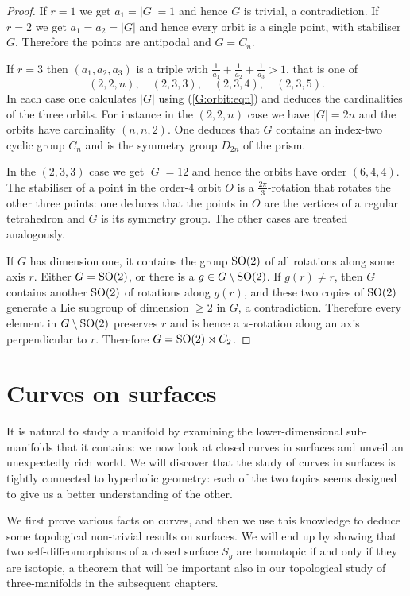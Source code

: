 \begin{proof}
If $r=1$ we get $a_1 = |G| = 1$ and hence $G$ is trivial, a contradiction. If $r=2$ we get $a_1 = a_2 = |G|$ and hence every orbit is a single point, with stabiliser $G$. Therefore the points are antipodal and $G=C_n$.

If $r=3$ then $(a_1,a_2, a_3)$ is a triple with $\frac 1{a_1} + \frac 1{a_2} + \frac 1{a_3} > 1$, that is one of
$$(2,2,n), \quad (2,3,3), \quad (2,3,4), \quad (2,3,5).$$
In each case one calculates $|G|$ using (\ref{G:orbit:eqn}) and deduces the cardinalities of the three orbits. For instance in the $(2,2,n)$ case we have $|G|=2n$ and the orbits have cardinality $(n,n,2)$. One deduces that $G$ contains an index-two cyclic group $C_n$ and is the symmetry group $D_{2n}$ of the prism.

In the $(2,3,3)$ case we get $|G|=12$ and hence the orbits have order $(6,4,4)$. The stabiliser of a point in the order-4 orbit $O$ is a $\frac{2\pi}3$-rotation that rotates the other three points: one deduces that the points in $O$ are the vertices of a regular tetrahedron and $G$ is its symmetry group. The other cases are treated analogously.

If $G$ has dimension one, it contains the group ${\rm SO}(2)$ of all rotations along some axis $r$. Either $G={\rm SO}(2)$, or there is a $g \in G \setminus {\rm SO}(2)$. If $g(r)\neq r$, then $G$ contains another ${\rm SO}(2)$ of rotations along $g(r)$, and these two copies of ${\rm SO}(2)$ generate a Lie subgroup of dimension $\geqslant 2$ in $G$, a contradiction. Therefore every element in $G\setminus {\rm SO}(2)$ preserves $r$ and is hence a $\pi$-rotation along an axis perpendicular to $r$. Therefore $G={\rm SO}(2) \rtimes C_2$.
\end{proof}

\section{Curves on surfaces} \label{curves:surfaces:section}
It is natural to study a manifold by examining the lower-dimensional sub-manifolds that it contains: we now look at closed curves in surfaces and unveil an unexpectedly rich world. We will discover that the study of curves in surfaces is tightly connected to hyperbolic geometry: 
each of the two topics seems designed to give us a better understanding of the other.

We first prove various facts on curves, and then we use this knowledge to deduce some topological non-trivial results on surfaces. We will end up by showing that two self-diffeomorphisms of a closed surface $S_g$ are homotopic if and only if they are isotopic, a theorem that will be important also in our topological study of three-manifolds in the subsequent chapters.

